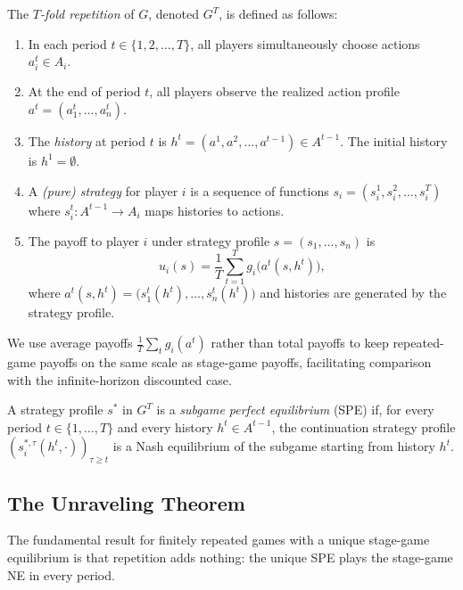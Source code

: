 \documentclass[11pt,a4paper]{article}
\begin{document}
\begin{definition}
\label{def:finitely-repeated}
The \emph{$T$-fold repetition} of $G$, denoted $G^T$, is defined as
follows:
\begin{enumerate}[label=(\alph*)]
    \item In each period $t \in \{1, 2, \ldots, T\}$, all players
    simultaneously choose actions $a_i^t \in A_i$.
    \item At the end of period $t$, all players observe the realized action
    profile $a^t = (a_1^t, \ldots, a_n^t)$.
    \item The \emph{history} at period $t$ is
    $h^t = (a^1, a^2, \ldots, a^{t-1}) \in A^{t-1}$. The initial history
    is $h^1 = \emptyset$.
    \item A \emph{(pure) strategy} for player $i$ is a sequence of functions
    $s_i = (s_i^1, s_i^2, \ldots, s_i^T)$ where $s_i^t : A^{t-1} \to A_i$
    maps histories to actions.
    \item The payoff to player $i$ under strategy profile
    $s = (s_1, \ldots, s_n)$ is
    \[
        u_i(s) = \frac{1}{T} \sum_{t=1}^T g_i\bigl(a^t(s, h^t)\bigr),
    \]
    where $a^t(s, h^t) = \bigl(s_1^t(h^t), \ldots, s_n^t(h^t)\bigr)$ and
    histories are generated by the strategy profile.
\end{enumerate}
\end{definition}

\begin{remark}
We use average payoffs $\frac{1}{T}\sum_t g_i(a^t)$ rather than total
payoffs to keep repeated-game payoffs on the same scale as stage-game
payoffs, facilitating comparison with the infinite-horizon discounted case.
\end{remark}

\begin{definition}
\label{def:spe-repeated}
A strategy profile $s^*$ in $G^T$ is a \emph{subgame perfect equilibrium}
(SPE) if, for every period $t \in \{1, \ldots, T\}$ and every history
$h^t \in A^{t-1}$, the continuation strategy profile
$(s_i^{*,\tau}(h^t, \cdot))_{\tau \geq t}$ is a Nash equilibrium of the
subgame starting from history $h^t$.
\end{definition}

\subsection{The Unraveling Theorem}

The fundamental result for finitely repeated games with a unique stage-game
equilibrium is that repetition adds nothing: the unique SPE plays the
stage-game NE in every period.
\end{document}
